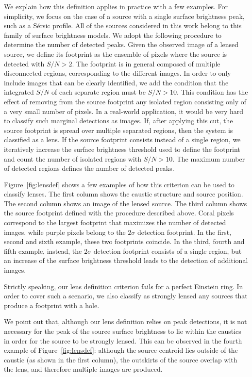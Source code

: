 \documentclass{aa}
\def\Fref#1{Figure~\ref{#1}\xspace}
\begin{document}
We explain how this definition applies in practice with a few examples.
For simplicity, we focus on the case of a source with a single surface brightness peak, such as a S\'{e}rsic profile. All of the sources considered in this work belong to this family of surface brightness models.
We adopt the following procedure to determine the number of detected peaks.
Given the observed image of a lensed source, we define its footprint as the ensemble of pixels where the source is detected with $S/N>2$. The footprint is in general composed of multiple disconnected regions, corresponding to the different images. In order to only include images that can be clearly identified, we add the condition that the integrated $S/N$ of each separate region must be $S/N > 10$. This condition has the effect of removing from the source footprint any isolated region consisting only of a very small number of pixels. In a real-world application, it would be very hard to classify such marginal detections as images.
If, after applying this cut, the source footprint is spread over multiple separated regions, then the system is classified as a lens.
If the source footprint consists instead of a single region, we iteratively increase the surface brightness threshold used to define the footprint and count the number of isolated regions with $S/N>10$. The maximum number of detected regions defines the number of detected peaks.

\Fref{fig:lensdef} shows a few examples of how this criterion can be used to classify lenses.
The first column shows the caustic structure and source position. The second column shows an image of the lensed source. 
The third column shows the source footprint defined with the procedure described above.
Coral pixels correspond to the largest footprint that maximizes the number of detected images, while purple pixels belong to the $2\sigma$ detection footprint. In the first, second and sixth example, these two footprints coincide.
In the third, fourth and fifth example, instead, the $2\sigma$ detection footprint consists of a single region, but an increase of the surface brightness threshold leads to the detection of additional images.

Strictly speaking, our lens definition criterion fails for a perfect Einstein ring. In order to cover such a scenario, we also classify as strongly lensed any sources that produce a footprint with a hole.

We point out that, although our lens definition relies on peak detections, it is not necessary for the peak of the source surface brightness to lie within the caustics in order for the source to be strongly lensed.
This can be observed in the fourth example of \Fref{fig:lensdef}: although the source centroid lies outside of the caustic (as shown in the first column), the outskirts of the source overlap with the lens, and therefore multiple images are produced.
\end{document}
